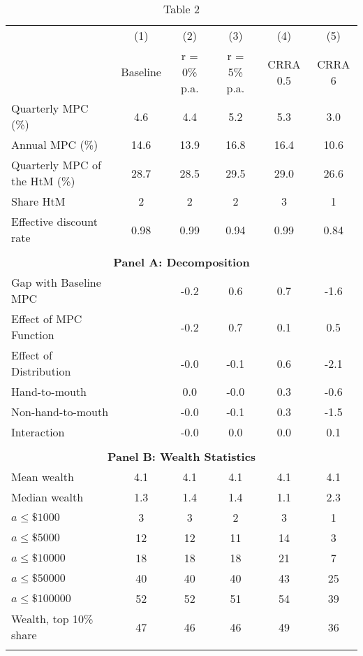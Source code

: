 
    \begin{table}[ht] %
    \caption*{Table 2} %
    \centering
    \begin{threeparttable} %
    \begin{tabular}{lccccc}
    \toprule
    {} &  (1)  &  (2)  &  (3)  &  (4)  &  (5)  \\
     & Baseline & r = 0\% p.a. & r = 5\% p.a. & CRRA 0.5 & CRRA 6 \\
    \midrule
    Quarterly MPC (\%) & 4.6 & 4.4 & 5.2 & 5.3 & 3.0 \\ 
    Annual MPC (\%) & 14.6 & 13.9 & 16.8 & 16.4 & 10.6 \\ 
    Quarterly MPC of the HtM (\%) & 28.7 & 28.5 & 29.5 & 29.0 & 26.6 \\ 
    Share HtM & 2 & 2 & 2 & 3 & 1 \\ 
    Effective discount rate & 0.98 & 0.99 & 0.94 & 0.99 & 0.84 \\ 
     & & & & & \\ 
    \toprule
    \multicolumn{6}{c}{\textbf{Panel A: Decomposition}} \\
    \midrule
    Gap with Baseline MPC &  & -0.2 & 0.6 & 0.7 & -1.6 \\ 
    Effect of MPC Function &  & -0.2 & 0.7 & 0.1 & 0.5 \\ 
    Effect of Distribution &  & -0.0 & -0.1 & 0.6 & -2.1 \\ 
    \quad Hand-to-mouth &  & 0.0 & -0.0 & 0.3 & -0.6 \\ 
    \quad Non-hand-to-mouth &  & -0.0 & -0.1 & 0.3 & -1.5 \\ 
    Interaction &  & -0.0 & 0.0 & 0.0 & 0.1 \\ 
     & & & & & \\ 
    \toprule
    \multicolumn{6}{c}{\textbf{Panel B: Wealth Statistics}} \\
    \midrule
    Mean wealth & 4.1 & 4.1 & 4.1 & 4.1 & 4.1 \\ 
    Median wealth & 1.3 & 1.4 & 1.4 & 1.1 & 2.3 \\ 
    $a \leq \$1000$ & 3 & 3 & 2 & 3 & 1 \\ 
    $a \leq \$5000$ & 12 & 12 & 11 & 14 & 3 \\ 
    $a \leq \$10000$ & 18 & 18 & 18 & 21 & 7 \\ 
    $a \leq \$50000$ & 40 & 40 & 40 & 43 & 25 \\ 
    $a \leq \$100000$ & 52 & 52 & 51 & 54 & 39 \\ 
    Wealth, top 10\% share & 47 & 46 & 46 & 49 & 36 \\ 
     & & & & & \\ 
    \bottomrule
    \end{tabular}
    \end{threeparttable} %
    \label{tab:table_r_rra}
    \end{table} %